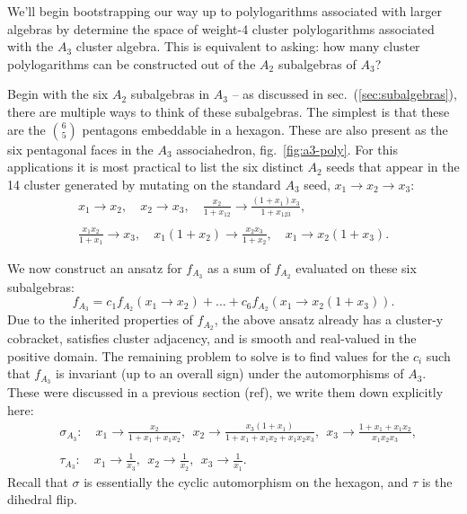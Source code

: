 \documentclass[11pt]{article}
\def\nl{\nonumber\\}
\def\nn{\nonumber}
\begin{document}
We'll begin bootstrapping our way up to polylogarithms associated with larger algebras by determine the space of weight-4 cluster polylogarithms associated with the $A_3$ cluster algebra. This is equivalent to asking: how many cluster polylogarithms can be constructed out of the $A_2$ subalgebras of $A_3$? 

Begin with the six $A_2$ subalgebras in $A_3$ -- as discussed in sec.~(\ref{sec:subalgebras}), there are multiple ways to think of these subalgebras. The simplest is that these are the $\binom{6}{5}$ pentagons embeddable in a hexagon. These are also present as the six pentagonal faces in the $A_3$ associahedron, fig.~\ref{fig:a3-poly}. For this applications it is most practical to list the six distinct $A_2$ seeds that appear in the 14 cluster generated by mutating on the standard $A_3$ seed, $x_1 \to x_2 \to x_3$:
\begin{equation}\label{eq:a2-in-a3}
\begin{gathered}
	x_1 \to x_2, \quad 
	x_2 \to x_3, \quad 
	\frac{x_2}{1+x_{12}}\to \frac{\left(1+x_1\right) x_3}{1+x_{123}},\\ \\
	\frac{x_1 x_2}{1+x_1}\to x_3,\quad 
	x_1 \left(1+x_2\right)\to \frac{x_2 x_3}{1+x_2},\quad
	 x_1\to x_2 \left(1+x_3\right).
\end{gathered}	
\end{equation}

We now construct an ansatz for $f_{A_3}$ as a sum of $f_{A_2}$ evaluated on these six subalgebras:
\begin{equation}
	f_{A_3} = c_1 f_{A_2}(x_1 \to x_2) + \ldots + c_6 f_{A_2}(x_1\to x_2 \left(1+x_3\right)). 
\end{equation}	
Due to the inherited properties of $f_{A_2}$, the above ansatz already has a cluster-y cobracket, satisfies cluster adjacency, and is smooth and real-valued in the positive domain. The remaining problem to solve is to find values for the $c_i$ such that $f_{A_3}$ is invariant (up to an overall sign) under the automorphisms of $A_3$. These were discussed in a previous section (ref), we write them down explicitly here:
\begin{align}
	&\sigma_{A_3}:\quad x_1 \to \frac{x_2}{1+x_1 + x_1 x_2}, ~~x_2 \to \frac{x_3(1+x_1)}{1+x_1 + x_1x_2 +x_1x_2x_3},~~ x_3 \to \frac{1+x_1 + x_1 x_2}{x_1x_2x_3},\nl \\
	&\tau_{A_3}:\quad x_1 \to \frac{1}{x_3}, ~~x_2\to\frac{1}{x_2},~~x_3\to \frac{1}{x_1}.\nn
\end{align}
Recall that $\sigma$ is essentially the cyclic automorphism on the hexagon, and $\tau$ is the dihedral flip. 
\end{document}
